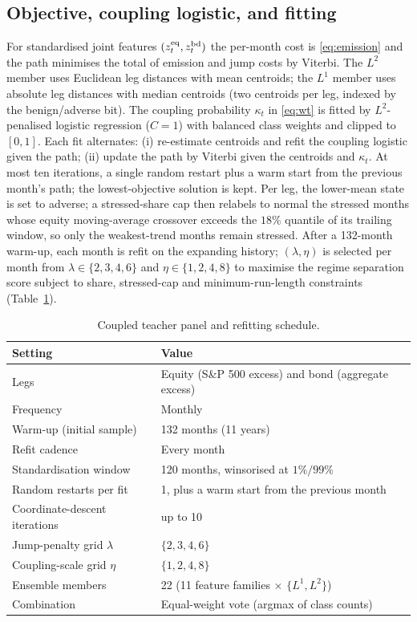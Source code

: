 \subsection*{Objective, coupling logistic, and fitting}
For standardised joint features $(z^{\mathrm{eq}}_t,z^{\mathrm{bd}}_t)$ the per-month cost is \eqref{eq:emission} and
the path minimises the total of emission and jump costs by Viterbi. The $L^2$ member uses
Euclidean leg distances with mean centroids; the $L^1$ member uses absolute leg distances
with median centroids (two centroids per leg, indexed by the benign/adverse bit). The
coupling probability $\kappa_t$ in \eqref{eq:wt} is fitted by $L^2$-penalised logistic regression
($C=1$) with balanced class weights and clipped to $[0,1]$. Each fit alternates: (i)
re-estimate centroids and refit the coupling logistic given the path; (ii) update the
path by Viterbi given the centroids and $\kappa_t$. At most ten iterations, a single random restart
plus a warm start from the previous month's path; the lowest-objective solution is kept. Per
leg, the lower-mean state is set to adverse; a stressed-share cap then relabels to normal
the stressed months whose equity moving-average crossover exceeds the $18\%$ quantile of its
trailing window, so only the weakest-trend months remain stressed. After a 132-month
warm-up, each month is refit on the expanding history; $(\lambda,\eta)$ is selected per month
from $\lambda\in\{2,3,4,6\}$ and $\eta\in\{1,2,4,8\}$ to maximise the regime separation score
subject to share, stressed-cap and minimum-run-length constraints (Table~\ref{tab:c-panel}).

\begin{table}[H]
\centering
\caption{Coupled teacher panel and refitting schedule.}
\label{tab:c-panel}
\small
\begin{tabular}{ll}
\toprule
Setting & Value \\
\midrule
Legs & Equity (S\&P 500 excess) and bond (aggregate excess) \\
Frequency & Monthly \\
Warm-up (initial sample) & 132 months (11 years) \\
Refit cadence & Every month \\
Standardisation window & 120 months, winsorised at $1\%/99\%$ \\
Random restarts per fit & 1, plus a warm start from the previous month \\
Coordinate-descent iterations & up to 10 \\
Jump-penalty grid $\lambda$ & $\{2,3,4,6\}$ \\
Coupling-scale grid $\eta$ & $\{1,2,4,8\}$ \\
Ensemble members & 22 (11 feature families $\times$ $\{L^1,L^2\}$) \\
Combination & Equal-weight vote (argmax of class counts) \\
\bottomrule
\end{tabular}
\end{table}


